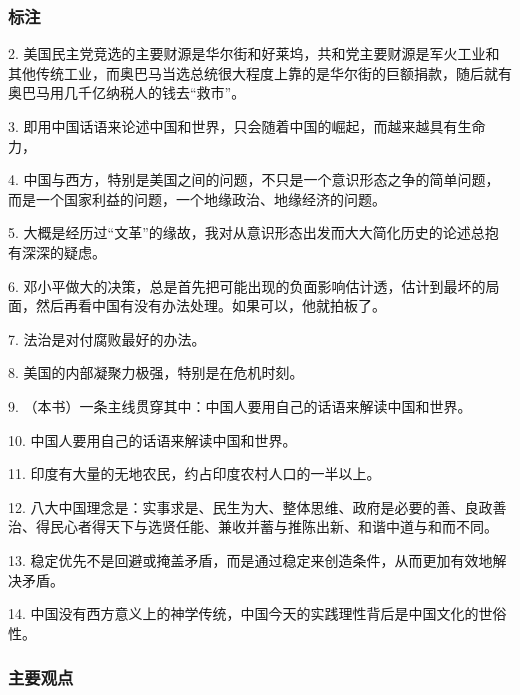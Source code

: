 \subsubsection{标注}

2. 美国民主党竞选的主要财源是华尔街和好莱坞，共和党主要财源是军火工业和其他传统工业，而奥巴马当选总统很大程度上靠的是华尔街的巨额捐款，随后就有奥巴马用几千亿纳税人的钱去“救市”。

3. 即用中国话语来论述中国和世界，只会随着中国的崛起，而越来越具有生命力，

4. 中国与西方，特别是美国之间的问题，不只是一个意识形态之争的简单问题，而是一个国家利益的问题，一个地缘政治、地缘经济的问题。

5. 大概是经历过“文革”的缘故，我对从意识形态出发而大大简化历史的论述总抱有深深的疑虑。

6. 邓小平做大的决策，总是首先把可能出现的负面影响估计透，估计到最坏的局面，然后再看中国有没有办法处理。如果可以，他就拍板了。

7. 法治是对付腐败最好的办法。

8. 美国的内部凝聚力极强，特别是在危机时刻。

9. （本书）一条主线贯穿其中：中国人要用自己的话语来解读中国和世界。

10. 中国人要用自己的话语来解读中国和世界。

11. 印度有大量的无地农民，约占印度农村人口的一半以上。

12. 八大中国理念是：实事求是、民生为大、整体思维、政府是必要的善、良政善治、得民心者得天下与选贤任能、兼收并蓄与推陈出新、和谐中道与和而不同。

13. 稳定优先不是回避或掩盖矛盾，而是通过稳定来创造条件，从而更加有效地解决矛盾。

14. 中国没有西方意义上的神学传统，中国今天的实践理性背后是中国文化的世俗性。

\subsubsection{主要观点}


